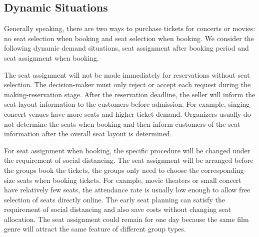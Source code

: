 
\subsection{Dynamic Situations}
Generally speaking, there are two ways to purchase tickets for concerts or movies: no seat selection when booking and seat selection when booking. We consider the following dynamic demand situations, seat assignment after booking period and seat assignment when booking.


The seat assignment will not be made immediately for reservations without seat selection. The decision-maker must only reject or accept each request during the making-reservation stage. After the reservation deadline, the seller will inform the seat layout information to the customers before admission. For example, singing concert venues have more seats and higher ticket demand. Organizers usually do not determine the seats when booking and then inform customers of the seat information after the overall seat layout is determined.





For seat assignment when booking, the specific procedure will be changed under the requirement of social distancing. The seat assignment will be arranged before the groups book the tickets, the groups only need to choose the corresponding-size seats when booking tickets. For example, movie theaters or small concert have relatively few seats, the attendance rate is usually low enough to allow free selection of seats directly online. The early seat planning can satisfy the requirement of social distancing and also save costs without changing seat allocation. The seat assignment could remain for one day because the same film genre will attract the same feature of different group types. 



